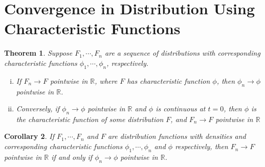 \documentclass[12pt]{amsbook}
\newcommand{\rr}{\mathbb{R}}
\theoremstyle{plain}
\newtheorem{theorem}{Theorem}
\newtheorem{corollary}[theorem]{Corollary}
\theoremstyle{definition}
\newtheorem*{definition}{Definition}
\theoremstyle{remark}
\numberwithin{equation}{section}  %
\numberwithin{equation}{section}  %
\begin{document}
	\section{Convergence in Distribution Using Characteristic Functions}
	\begin{theorem}\label{thm:conv-char-dist}
		Suppose $F_{1}, \cdots, F_{n}$ are a sequence of distributions
		with corresponding characteristic functions
		$\phi_{1}, \cdots, \phi_{n}$, respectively. 
		\begin{enumerate}[(i)]
			\item If $F_{n} \to F$ pointwise in $\rr$,
				where $F$ has characteristic function
				$\phi$, then $\phi_{n} \to \phi$ pointwise in $\rr$.
			\item Conversely, if  $\phi_{n} \to \phi$ pointwise in $\rr$ and 
				$\phi$ is continuous at $t = 0$, then $\phi$ is the characteristic
				function of some distribution $F$, and $F_{n} \to F$ pointwise
				in $\rr$
		\end{enumerate}
	\end{theorem}
	\begin{corollary}
		If $F_{1}, \cdots, F_{n}$ and $F$ are distribution functions with densities
		and corresponding characteristic functions $\phi_{1}, \cdots, \phi_{n}$ and
		$\phi$ respectively, then $F_{n} \to F$ pointwise in $\rr$ if and only if
		$\phi_{n} \to \phi$ pointwise in $\rr$.
	\end{corollary}
\end{document}
